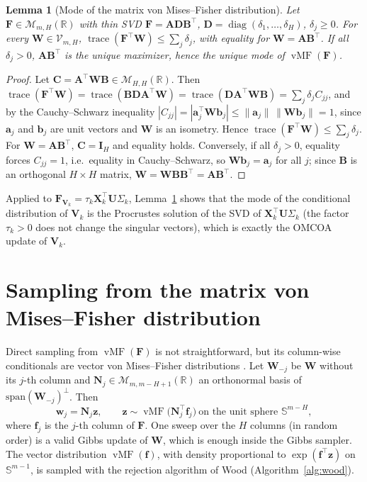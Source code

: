 \documentclass[11pt]{article}
\newtheorem{lemma}{Lemma}
\DeclareMathOperator{\diag}{diag}
\DeclareMathOperator{\trace}{trace}
\DeclareMathOperator{\vMF}{vMF}
\newcommand{\X}{\mathbf{X}}
\newcommand{\U}{\mathbf{U}}
\newcommand{\V}{\mathbf{V}}
\newcommand{\F}{\mathbf{F}}
\newcommand{\W}{\mathbf{W}}
\newcommand{\ww}{\mathbf{w}}
\newcommand{\f}{\mathbf{f}}
\newcommand{\z}{\mathbf{z}}
\newcommand{\I}{\mathbf{I}}
\newcommand{\Stiefel}[2]{\mathcal V_{#1,#2}}
\begin{document}
\begin{lemma}[Mode of the matrix von Mises--Fisher distribution]\label{lem:mode}
Let $\F\in\mathcal M_{m,H}(\mathbb R)$ with thin SVD $\F=\mathbf A\mathbf D\mathbf B^\intercal$, $\mathbf D=\diag(\delta_1,\ldots,\delta_H)$, $\delta_j\geq0$.
For every $\W\in\Stiefel{m}{H}$, $\trace(\F^\intercal\W)\leq\sum_j\delta_j$, with equality for $\W=\mathbf A\mathbf B^\intercal$. If all $\delta_j>0$,
$\mathbf A\mathbf B^\intercal$ is the unique maximizer, hence the unique mode of $\vMF(\F)$.
\end{lemma}

\begin{proof}
Let $\mathbf C=\mathbf A^\intercal\W\mathbf B\in\mathcal M_{H,H}(\mathbb R)$. Then
$\trace(\F^\intercal\W)=\trace(\mathbf B\mathbf D\mathbf A^\intercal\W)=\trace(\mathbf D\mathbf A^\intercal\W\mathbf B)=\sum_j\delta_jC_{jj}$, and by the
Cauchy--Schwarz inequality $|C_{jj}|=|\mathbf a_j^\intercal\W\mathbf b_j|\leq\|\mathbf a_j\|\,\|\W\mathbf b_j\|=1$, since $\mathbf a_j$ and
$\mathbf b_j$ are unit vectors and $\W$ is an isometry. Hence $\trace(\F^\intercal\W)\leq\sum_j\delta_j$. For $\W=\mathbf A\mathbf B^\intercal$,
$\mathbf C=\I_H$ and equality holds. Conversely, if all $\delta_j>0$, equality forces $C_{jj}=1$, i.e.\ equality in Cauchy--Schwarz,
so $\W\mathbf b_j=\mathbf a_j$ for all $j$; since $\mathbf B$ is an orthogonal $H\times H$ matrix, $\W=\W\mathbf B\mathbf B^\intercal=\mathbf A\mathbf B^\intercal$.
\end{proof}

\noindent Applied to $\F_{\V_k}=\tau_k\X_k^\intercal\U\Sigma_k$, Lemma~\ref{lem:mode} shows that the mode of the conditional distribution of
$\V_k$ is the Procrustes solution of the SVD of $\X_k^\intercal\U\Sigma_k$ (the factor $\tau_k>0$ does not change the singular vectors),
which is exactly the OMCOA update of $\V_k$.

\section{Sampling from the matrix von Mises--Fisher distribution}

Direct sampling from $\vMF(\F)$ is not straightforward, but its column-wise conditionals are vector von
Mises--Fisher distributions \cite{hoff2009}. Let $\W_{-j}$ be $\W$ without its $j$-th column and
$\mathbf N_j\in\mathcal M_{m,m-H+1}(\mathbb R)$ an orthonormal basis of $\mathrm{span}(\W_{-j})^\perp$. Then
\[
  \ww_j=\mathbf N_j\z,\qquad \z\sim\vMF\bigl(\mathbf N_j^\intercal\f_j\bigr)\ \text{on the unit sphere } \mathbb S^{m-H},
\]
where $\f_j$ is the $j$-th column of $\F$. One sweep over the $H$ columns (in random order) is a valid Gibbs update
of $\W$, which is enough inside the Gibbs sampler. The vector distribution $\vMF(\f)$, with density
proportional to $\exp(\f^\intercal\z)$ on $\mathbb S^{m-1}$, is sampled with the rejection algorithm of Wood \cite{wood1994}
(Algorithm~\ref{alg:wood}).
\end{document}
